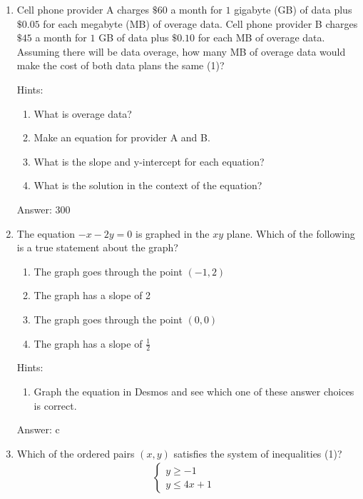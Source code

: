 \documentclass{article}
\begin{document}
\begin{enumerate}
{	      Answer: Show a few different inequalities to the student. Ask them what matches the given equation.}
	\item {Cell phone provider A charges $\$60$ a month for $1$ gigabyte (GB) of data plus $\$0.05$ for each megabyte (MB) of overage data. Cell phone provider B charges $\$45$ a month for $1$ GB of data plus $\$0.10$ for each MB of overage data. Assuming there will be data overage, how many MB of overage data would make the cost of both data plans the same (1)?

		      Hints:
		      \begin{enumerate}
			      \item {What is overage data?}
			      \item {Make an equation for provider A and B.}
			      \item {What is the slope and y-intercept for each equation?}
			      \item {What is the solution in the context of the equation?}
		      \end{enumerate}

		      Answer: $300$
	      }
	\item {The equation \(-x-2y=0\) is graphed in the $xy$ plane. Which of the following is a true statement about the graph?

	      \begin{enumerate}
		      \item {The graph goes through the point $(-1,2)$}
		      \item {The graph has a slope of 2}
		      \item {The graph goes through the point $(0,0)$}
		      \item {The graph has a slope of \(\frac{1}{2}\)}
	      \end{enumerate}

	      Hints:
	      \begin{enumerate}
		      \item{Graph the equation in Desmos and see which one of these answer choices is correct.}
	      \end{enumerate}

	      Answer: c
	      }

	\item {
	      Which of the ordered pairs $(x,y)$ satisfies the system of inequalities (1)?
	      \[
		      \begin{array}{l}
			      \begin{cases}
				      y \geq -1 & \\
				      y \leq 4x + 1
			      \end{cases}
		      \end{array}
	      \]

}
\end{enumerate}
\end{document}
